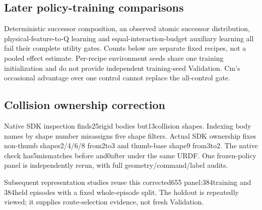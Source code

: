 \documentclass[10pt]{article}
\begin{document}
\subsection{Later policy-training comparisons}
Deterministic successor composition, an observed atomic successor distribution,
physical-feature-to-Q learning and equal-interaction-budget auxiliary learning
all fail their complete utility gates. Counts below are separate fixed recipes,
not a pooled effect estimate. Per-recipe environment seeds share one training
initialization and do not provide independent training-seed Validation. Cm's
occasional advantage over one control cannot replace the all-control gate.
\begin{table}[ht]\centering\small

\caption{Later trained-policy physical105 counts, each arm /384; legacy physics.
The task-Q column in the last two rows uses different declared budgets.}
\end{table}
\subsection{Collision ownership correction}
Native SDK inspection finds25rigid bodies but13collision shapes. Indexing body
names by shape number misassigns five shape filters. Actual SDK ownership fixes
non-thumb shapes2/4/6/8 from2to3 and thumb-base shape9 from3to2. The native
check has5mismatches before and0after under the same URDF. One frozen-policy
panel is independently rerun, with full geometry/command/label audits.
\begin{table}[ht]\centering

\caption{Fixed-policy sensitivity to corrected collision ownership. One seed,
no retraining, no exact paired solver states. PROMISING refers to sensitivity,
not Cm utility or performance improvement. All motion0counts remain zero.}
\end{table}
Subsequent representation studies reuse this corrected655 panel:384training and
384held episodes with a fixed whole-episode split. The holdout is repeatedly
viewed; it supplies route-selection evidence, not fresh Validation.

\clearpage
\end{document}
